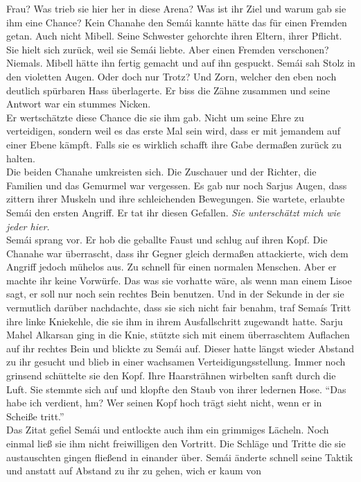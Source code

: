Frau? Was trieb sie hier her in diese Arena? Was ist ihr Ziel und warum gab sie ihm eine Chance? 
Kein Chanahe den Semái kannte hätte das für einen Fremden getan. Auch nicht Mibell. Seine Schwester 
gehorchte ihren Eltern, ihrer Pflicht. Sie hielt sich zurück, weil sie Semái liebte. Aber einen 
Fremden verschonen? Niemals. Mibell hätte ihn fertig gemacht und auf ihn gespuckt. Semái sah Stolz 
in den violetten Augen. Oder doch nur Trotz? Und Zorn, welcher den eben noch deutlich spürbaren 
Hass überlagerte. Er biss die Zähne zusammen und seine Antwort war ein stummes Nicken. \\
Er wertschätzte diese Chance die sie ihm gab. Nicht um seine Ehre zu verteidigen, sondern weil es 
das erste Mal sein wird, dass er mit jemandem auf einer Ebene kämpft. Falls sie es wirklich schafft 
ihre Gabe dermaßen zurück zu halten.\\
Die beiden Chanahe umkreisten sich. Die Zuschauer und der Richter, die Familien und das Gemurmel 
war vergessen. Es gab nur noch Sarjus Augen, dass zittern ihrer Muskeln und ihre 
schleichenden Bewegungen. Sie wartete, erlaubte Semái den ersten Angriff. Er tat ihr diesen 
Gefallen. \textit{Sie unterschätzt mich wie jeder hier.}\\
Semái sprang vor. Er hob die geballte Faust und schlug auf ihren Kopf. Die Chanahe war überrascht, 
dass ihr Gegner gleich dermaßen attackierte, wich dem Angriff jedoch mühelos aus. Zu schnell 
für einen normalen Menschen. Aber er machte ihr keine Vorwürfe. Das was sie vorhatte wäre, als wenn 
man einem Lisoe sagt, er soll nur noch sein rechtes Bein benutzen. Und in der Sekunde in der sie 
vermutlich darüber nachdachte, dass sie sich nicht fair benahm, traf Semaís Tritt ihre linke 
Kniekehle, die sie ihm in ihrem Ausfallschritt zugewandt hatte. Sarju Mahel Alkarsan ging in die 
Knie, stützte sich mit einem überraschtem Auflachen auf ihr rechtes Bein und blickte zu Semái auf. 
Dieser hatte längst wieder Abstand zu ihr gesucht und blieb in einer wachsamen 
Verteidigungsstellung. Immer noch grinsend schüttelte sie den Kopf. Ihre Haarsträhnen wirbelten 
sanft durch die Luft. Sie stemmte sich auf und klopfte den Staub von ihrer ledernen Hose. ``Das 
habe ich verdient, hm? Wer seinen Kopf hoch trägt sieht nicht, wenn er in Scheiße tritt.''\\
Das Zitat gefiel Semái und entlockte auch ihm ein grimmiges Lächeln. Noch einmal ließ sie ihm nicht 
freiwilligen den Vortritt. Die Schläge und Tritte die sie austauschten gingen fließend in einander 
über. Semái änderte schnell seine Taktik und anstatt auf Abstand zu ihr zu gehen, wich er kaum von 
